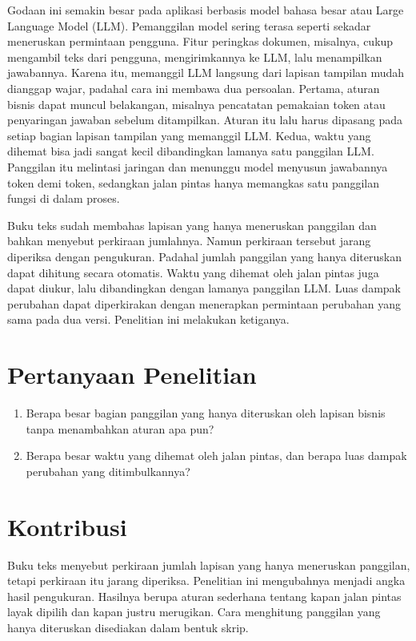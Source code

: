 \documentclass[11pt,a4paper]{article}
\begin{document}
Godaan ini semakin besar pada aplikasi berbasis model bahasa besar atau Large Language Model (LLM). Pemanggilan model sering terasa seperti sekadar meneruskan permintaan pengguna. Fitur peringkas dokumen, misalnya, cukup mengambil teks dari pengguna, mengirimkannya ke LLM, lalu menampilkan jawabannya. Karena itu, memanggil LLM langsung dari lapisan tampilan mudah dianggap wajar, padahal cara ini membawa dua persoalan. Pertama, aturan bisnis dapat muncul belakangan, misalnya pencatatan pemakaian token atau penyaringan jawaban sebelum ditampilkan. Aturan itu lalu harus dipasang pada setiap bagian lapisan tampilan yang memanggil LLM. Kedua, waktu yang dihemat bisa jadi sangat kecil dibandingkan lamanya satu panggilan LLM. Panggilan itu melintasi jaringan dan menunggu model menyusun jawabannya token demi token, sedangkan jalan pintas hanya memangkas satu panggilan fungsi di dalam proses.

Buku teks sudah membahas lapisan yang hanya meneruskan panggilan dan bahkan menyebut perkiraan jumlahnya. Namun perkiraan tersebut jarang diperiksa dengan pengukuran. Padahal jumlah panggilan yang hanya diteruskan dapat dihitung secara otomatis. Waktu yang dihemat oleh jalan pintas juga dapat diukur, lalu dibandingkan dengan lamanya panggilan LLM. Luas dampak perubahan dapat diperkirakan dengan menerapkan permintaan perubahan yang sama pada dua versi. Penelitian ini melakukan ketiganya.

\section{Pertanyaan Penelitian}

\begin{enumerate}[label=\textbf{Pertanyaan \arabic*.}, leftmargin=*, labelsep=0.5em]
  \item Berapa besar bagian panggilan yang hanya diteruskan oleh lapisan bisnis tanpa menambahkan aturan apa pun?
  \item Berapa besar waktu yang dihemat oleh jalan pintas, dan berapa luas dampak perubahan yang ditimbulkannya?
\end{enumerate}

\section{Kontribusi}

Buku teks menyebut perkiraan jumlah lapisan yang hanya meneruskan panggilan, tetapi perkiraan itu jarang diperiksa. Penelitian ini mengubahnya menjadi angka hasil pengukuran. Hasilnya berupa aturan sederhana tentang kapan jalan pintas layak dipilih dan kapan justru merugikan. Cara menghitung panggilan yang hanya diteruskan disediakan dalam bentuk skrip.
\end{document}
